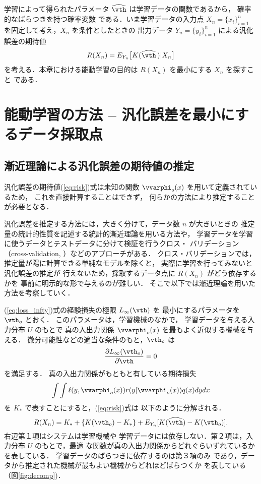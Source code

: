 \documentclass[master]{cimt}
\newcommand{\hvth}{\widehat{{\vth}}}
\begin{document}
学習によって得られたパラメータ $\hvth$ は学習データの関数であるから，
確率的なばらつきを持つ確率変数
である．いま学習データの入力点 $X_n=\{ x_i\}_{i=1}^n$ 
を固定して考え，$X_n$ を条件としたときの
出力データ $Y_n = \{ y_i \}_{i=1}^n$ による汎化誤差の期待値
\begin{equation}
\label{eq:risk}
R(X_n) = E_{Y_n}\bigl[ K(\hvth \,) | X_n \bigr]
\end{equation}
を考える．本章における能動学習の目的は $R(X_n)$ を最小にする $X_n$ を探すこと
である．


\section{能動学習の方法 -- 汎化誤差を最小にするデータ採取点}
\label{sec:active_learning}
\subsection{漸近理論による汎化誤差の期待値の推定}
\label{sec:risk_expansion}
汎化誤差の期待値(\ref{eq:risk})式は未知の関数 
$\vvarphi_o(x)$ を用いて定義されているため，
これを直接計算することはできず，
何らかの方法により推定することが必要となる．

汎化誤差を推定する方法には，大きく分けて，データ数 $n$ が大きいときの
推定量の統計的性質を記述する統計的漸近理論を用いる方法や，
学習データを学習に使うデータとテストデータに分けて検証を行うクロス・
バリデーション（cross-validation, \cite{CV}）などのアプローチがある．
クロス・バリデーションでは，推定量が陽に計算できる単純なモデルを除くと，
実際に学習を行ってみないと汎化誤差の推定が
行えないため，採取するデータ点に $R(X_n)$ がどう依存するかを
事前に明示的な形で与えるのが難しい．
そこで以下では漸近理論を用いた方法を考察していく．

(\ref{eq:loss_infty})式の経験損失の極限 $L_\infty(\vth)$ を
最小にするパラメータを $\vth_o$ とおく．
このパラメータは，学習機械のなかで，
学習データを与える入力分布 $U$ のもとで
真の入出力関係 $\vvarphi_o(x)$ を最もよく近似する機械を与える．
微分可能性などの適当な条件のもと，$\vth_o$ は
\begin{equation}
\label{eq:K_der}
	\frac{\partial L_\infty(\vth_o)}{\partial \vth} = 0
\end{equation}
を満足する．
真の入出力関係がもともと有している期待損失
\[
	\int \int \ell(y, \vvarphi_o(x)) r(y | \vvarphi_o(x)) q(x) 
		dy d x
\]
を $K_*$ で表すことにすると，(\ref{eq:risk})式は
以下のように分解される．
\begin{equation}
\label{eq:risk_decomp}
	R(X_n) = K_* + \{ K(\vth_o)-K_* \} + E_{Y_n} 
		[ K(\hvth) - K(\vth_o) ].
\end{equation}
右辺第１項はシステムは学習機械や
学習データには依存しない．第２項は，入力分布 $U$ のもとで，最適
な関数が真の入出力関係からどれぐらいずれているかを表している．
学習データのばらつきに依存するのは第３項のみ
であり，データから推定された機械が最もよい機械からどれほどばらつくか
を表している（図\ref{fig:decomp})．
\end{document}
